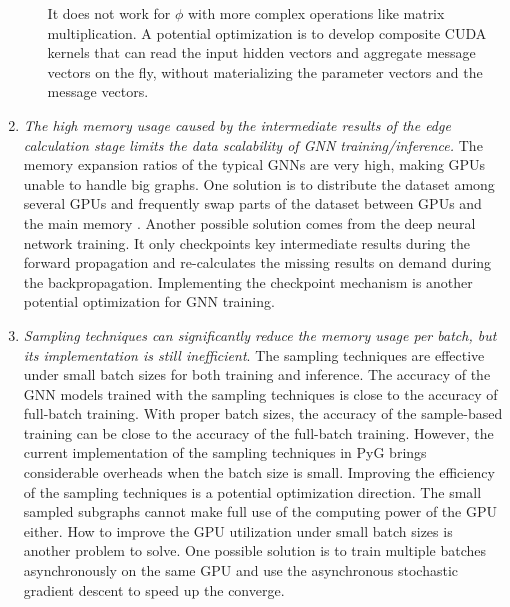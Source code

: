 \begin{enumerate}
\begin{itemize}
                    It does not work for $\phi$ with more complex operations like matrix multiplication.
                    A potential optimization is to develop composite CUDA kernels that can read the input hidden vectors and aggregate message vectors on the fly, without materializing the parameter vectors and the message vectors.
         \end{itemize}
    \item \emph{The high memory usage caused by the intermediate results of the edge calculation stage limits the data scalability of GNN training/inference.}
          The memory expansion ratios of the typical GNNs are very high, making GPUs unable to handle big graphs.
          One solution is to distribute the dataset among several GPUs and frequently swap parts of the dataset between GPUs and the main memory \cite{ma2019_neugraph}.
          Another possible solution \cite{chen2016_training_deep} comes from the deep neural network training. %
          It only checkpoints key intermediate results during the forward propagation and re-calculates the missing results on demand during the backpropagation.
          Implementing the checkpoint mechanism is another potential optimization for GNN training.

    \item \emph{Sampling techniques can significantly reduce the memory usage per batch, but its implementation is still inefficient}.
          The sampling techniques are effective under small batch sizes for both training and inference.
          The accuracy of the GNN models trained with the sampling techniques is close to the accuracy of full-batch training.
          With proper batch sizes, the accuracy of the sample-based training can be close to the accuracy of the full-batch training.
          However, the current implementation of the sampling techniques in PyG brings considerable overheads when the batch size is small.
          Improving the efficiency of the sampling techniques is a potential optimization direction.
          The small sampled subgraphs cannot make full use of the computing power of the GPU either.
          How to improve the GPU utilization under small batch sizes is another problem to solve.
          One possible solution is to train multiple batches asynchronously on the same GPU and use the asynchronous stochastic gradient descent to speed up the converge.
\end{enumerate}
